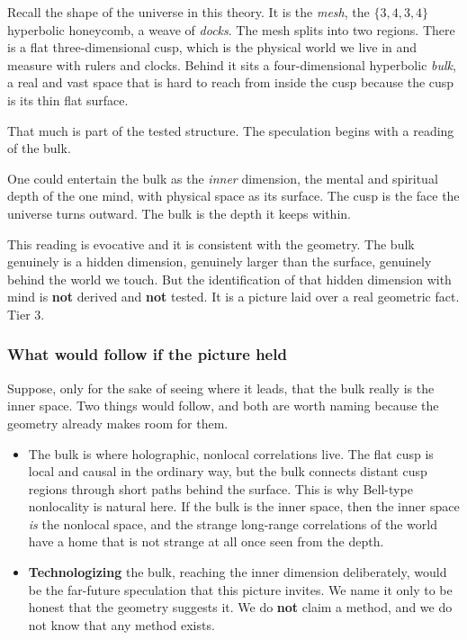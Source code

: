 Recall the shape of the universe in this theory. It is the \emph{mesh}, the $\{3,4,3,4\}$ hyperbolic honeycomb, a weave of \emph{docks}. The mesh splits into two regions. There is a flat three-dimensional cusp, which is the physical world we live in and measure with rulers and clocks. Behind it sits a four-dimensional hyperbolic \emph{bulk}, a real and vast space that is hard to reach from inside the cusp because the cusp is its thin flat surface.

That much is part of the tested structure. The speculation begins with a reading of the bulk.

\begin{principle}
One could entertain the bulk as the \emph{inner} dimension, the mental and spiritual depth of the one mind, with physical space as its surface. The cusp is the face the universe turns outward. The bulk is the depth it keeps within.
\end{principle}

This reading is evocative and it is consistent with the geometry. The bulk genuinely is a hidden dimension, genuinely larger than the surface, genuinely behind the world we touch. But the identification of that hidden dimension with mind is \textbf{not} derived and \textbf{not} tested. It is a picture laid over a real geometric fact. Tier 3.

\subsubsection{What would follow if the picture held}

Suppose, only for the sake of seeing where it leads, that the bulk really is the inner space. Two things would follow, and both are worth naming because the geometry already makes room for them.

\begin{itemize}
\item The bulk is where holographic, nonlocal correlations live. The flat cusp is local and causal in the ordinary way, but the bulk connects distant cusp regions through short paths behind the surface. This is why Bell-type nonlocality is natural here. If the bulk is the inner space, then the inner space \emph{is} the nonlocal space, and the strange long-range correlations of the world have a home that is not strange at all once seen from the depth.
\item \textbf{Technologizing} the bulk, reaching the inner dimension deliberately, would be the far-future speculation that this picture invites. We name it only to be honest that the geometry suggests it. We do \textbf{not} claim a method, and we do not know that any method exists.
\end{itemize}

